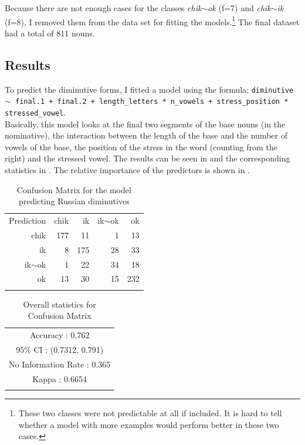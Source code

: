 Because there are not enough cases for the classes \textit{chik$\sim$ok} (f=7) and \textit{chik$\sim$ik} (f=8), I removed them from the data set for fitting the models.\footnote{These two classes were not predictable at all if included. It is hard to tell whether a model with more examples would perform better in these two cases.} The final dataset had a total of 811 nouns.

\subsection{Results}

To predict the diminutive forms, I fitted a model using the formula: \texttt{diminutive $\sim$ final.1 + final.2 + length\_letters * n\_vowels + stress\_position * stressed\_vowel}. \\Basically, this model looks at the final two segments of the base nouns (in the nominative), the interaction between the length of the base and the number of vowels of the base, the position of the stress in the word (counting from the right) and the stressed vowel. The results can be seen in  and the corresponding statistics in . The relative importance of the predictors is shown in .

\begin{table}
  \centering
  \begin{tabular}{rrrrr}
    \lsptoprule
    \multicolumn{5}{c}{Reference}               \\
    \midrule
    Prediction  & chik & ik  & ik$\sim$ok & ok  \\
     chik       & 177  & 11  & 1          & 13  \\
     ik         & 8    & 175 & 28         & 33  \\
     ik$\sim$ok & 1    & 22  & 34         & 18  \\
     ok         & 13   & 30  & 15         & 232 \\
    \lspbottomrule
  \end{tabular}
  \caption{Confusion Matrix for the model predicting Russian diminutives}\label{tab:dim-russ}
\end{table}

\begin{table}
  \centering
  \begin{tabular}{llrrr}
    \lsptoprule
    \multicolumn{5}{c}{Overall statistics:} \\

    \midrule
    \multicolumn{5}{c}{Accuracy : 0.762}\\
    \multicolumn{5}{c}{95\% CI : (0.7312, 0.791)}\\
    \multicolumn{5}{c}{No Information Rate : 0.365}\\
    \multicolumn{5}{c}{Kappa : 0.6654}\\
    \lspbottomrule
  \end{tabular}
  \caption{Overall statistics for Confusion Matrix }\label{tab:dim-russ-stats}
\end{table}

